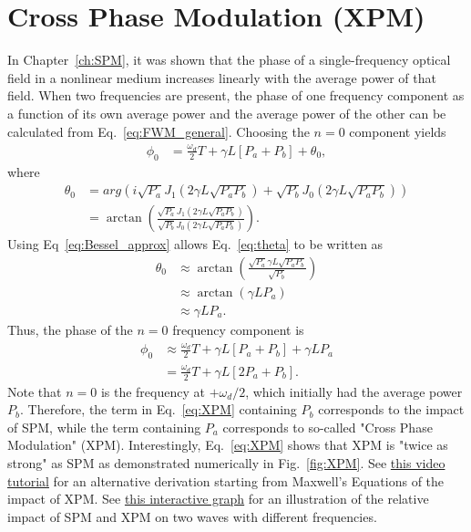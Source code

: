 \section{Cross Phase Modulation (XPM)}
\label{Sec:XPM}
In Chapter~\ref{ch:SPM}, it was shown that the phase of a single-frequency optical field in a nonlinear medium increases linearly with the average power of that field. When two frequencies are present, the phase of one frequency component as a function of its own average power and the average power of the other can be calculated from Eq.~\ref{eq:FWM_general}. Choosing the $n=0$ component yields
\begin{align}
    \phi_0 &= \frac{\omega_d}{2}T+\gamma L [P_a+P_b]+\theta_0,
\end{align}
where
\begin{align}
\label{eq:theta}
    \theta_0 &= arg\left( i\sqrt{P_a}J_{1}\left(2\gamma L\sqrt{P_aP_b}\right)+\sqrt{P_b}J_0\left(2\gamma L\sqrt{P_aP_b}\right) \right) \\ \nonumber
    &= \arctan\left(\frac{\sqrt{P_a}J_{1}\left(2\gamma L\sqrt{P_aP_b}\right)}{\sqrt{P_b}J_0\left(2\gamma L\sqrt{P_aP_b}\right) } \right).
\end{align}
Using Eq~\ref{eq:Bessel_approx} allows Eq.~\ref{eq:theta} to be written as
\begin{align}
    \theta_0 &\approx\arctan\left(\frac{\sqrt{P_a}\gamma L\sqrt{P_aP_b}}{\sqrt{P_b} } \right) \\ \nonumber
    &\approx\arctan\left(\gamma LP_a\right) \\ \nonumber
    &\approx \gamma LP_a.
\end{align}
Thus, the phase of the $n=0$ frequency component is
\begin{align}
    \label{eq:XPM}
    \phi_0 &\approx \frac{\omega_d}{2}T+\gamma L [P_a+P_b]+\gamma LP_a \\ \nonumber
    &=\frac{\omega_d}{2}T+\gamma L [2P_a+P_b].
\end{align}
Note that $n=0$ is the frequency at $+\omega_d/2$, which initially had the average power $P_b$. Therefore, the term in Eq.~\ref{eq:XPM} containing $P_b$ corresponds to the impact of SPM, while the term containing $P_a$ corresponds to so-called "Cross Phase Modulation" (XPM). Interestingly, Eq.~\ref{eq:XPM} shows that XPM is "twice as strong" as SPM as demonstrated numerically in Fig.~\ref{fig:XPM}. See \href{https://youtu.be/aDXd13zLPC4}{this video tutorial} for an alternative derivation starting from Maxwell's Equations of the impact of XPM. See \href{https://www.desmos.com/calculator/vstlwgtlyb}{this interactive graph} for an illustration of the relative impact of SPM and XPM on two waves with different frequencies.

